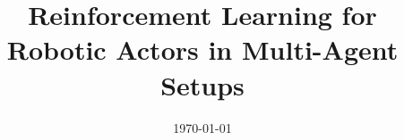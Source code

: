 \documentclass[a4paper, 11pt, oneside]{Thesis} %
\begin{document}
\frontmatter  %

\title {Reinforcement Learning for Robotic Actors in Multi-Agent Setups}
\addresses {\groupname\\\deptname\\\univname} %
\date  {\today}
\subject {}
\keywords {}

\maketitle


\fancyhead{} %
\rhead{\thepage} %
\lhead{} %

\pagestyle{fancy} %




 
 
 
\end{document}
